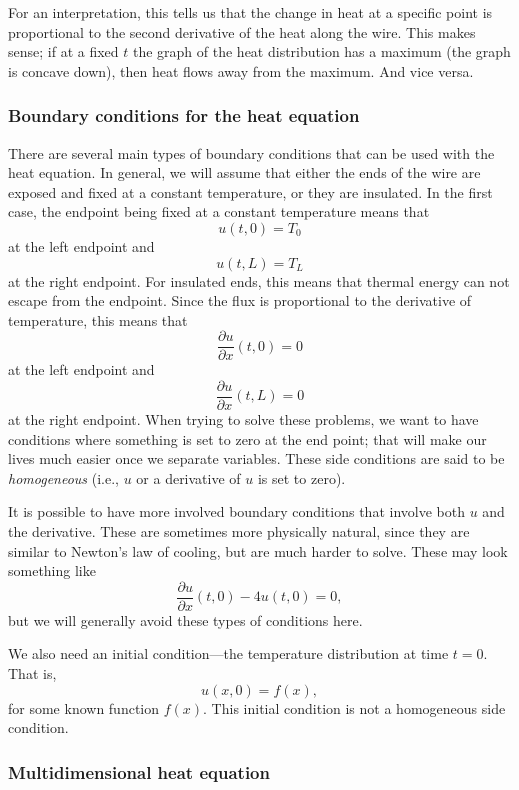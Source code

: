\documentclass{ximera}
\begin{document}
For an interpretation, this tells us that the change in heat at a specific point is proportional to the second derivative of the heat along the wire.  This makes sense; if at a fixed $t$ the graph of the heat distribution has a maximum (the graph is concave down), then heat flows away from the maximum.  And vice versa.

\subsubsection{Boundary conditions for the heat equation}

There are several main types of boundary conditions that can be used with the heat equation. In general, we will assume that either the ends of the wire are exposed and fixed at a constant temperature, or they are insulated. In the first case, the endpoint being fixed at a constant temperature means that
\[ 
    u(t,0) = T_0
\] 
at the left endpoint and
\[ 
    u(t,L) = T_L 
\] 
at the right endpoint. For insulated ends, this means that thermal energy can not escape from the endpoint. Since the flux is proportional to the derivative of temperature, this means that
\[ 
    \frac{\partial u}{\partial x}(t, 0) = 0 
\] 
at the left endpoint and
\[ 
    \frac{\partial u}{\partial x}(t, L) = 0 
\] 
at the right endpoint. When trying to solve these problems, we want to have conditions where something is set to zero at the end point; that will make our lives much easier once we separate variables. These side conditions are said to be \emph{homogeneous} (i.e., $u$ or a derivative of $u$ is set to zero).

It is possible to have more involved boundary conditions that involve both $u$ and the derivative. These are sometimes more physically natural, since they are similar to Newton's law of cooling, but are much harder to solve. These may look something like
\[ 
    \frac{\partial u}{\partial x}(t,0) - 4 u(t,0) = 0, 
\] 
but we will generally avoid these types of conditions here. 

We also need an initial condition---the temperature distribution at time $t=0$.  That is,
\begin{equation*}
    u(x,0) = f(x) ,
\end{equation*}
for some known function $f(x)$. This initial condition is not a homogeneous side condition. 

\subsubsection{Multidimensional heat equation}
\end{document}
